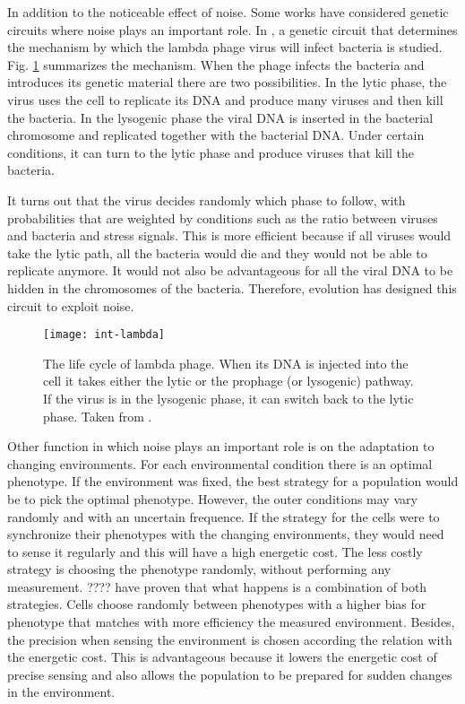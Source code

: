 In addition to the noticeable effect of noise. Some works have considered genetic circuits where noise plays an important role. In \cite{arkin98}, a genetic circuit that determines the mechanism by which the lambda phage virus will infect bacteria is studied. Fig. \ref{fig:int-lambda} summarizes the mechanism. When the phage infects the bacteria and introduces its genetic material there are two possibilities. In the lytic phase, the virus uses the cell to replicate its DNA and produce many viruses and then kill the bacteria. In the lysogenic phase the viral DNA is inserted in the bacterial chromosome and replicated together with the bacterial DNA. Under certain conditions, it can turn to the lytic phase and produce viruses that kill the bacteria.

It turns out that the virus decides randomly which phase to follow, with probabilities that are weighted by conditions such as the ratio between viruses and bacteria and stress signals. This is more efficient because if all viruses would take the lytic path, all the bacteria would die and they would not be able to replicate anymore. It would not also be advantageous for all the viral DNA to be hidden in the chromosomes of the bacteria. Therefore, evolution has designed this circuit to exploit noise.

\begin{figure}[H]
  \centering
  \texttt{[image: int-lambda]}
  \caption[Life cycle of lambda phage]{\label{fig:int-lambda} The life cycle of lambda phage. When its DNA is injected into the cell it takes either the lytic or the prophage (or lysogenic) pathway. If the virus is in the lysogenic phase, it can switch back to the lytic phase. Taken from \cite{alberts08}.}
\end{figure}

Other function in which noise plays an important role is on the adaptation to changing environments. For each environmental condition there is an optimal phenotype. If the environment was fixed, the best strategy for a population would be to pick the optimal phenotype. However, the outer conditions may vary randomly and with an uncertain frequence. If the strategy for the cells were to synchronize their phenotypes with the changing environments, they would need to sense it regularly and this will have a high energetic cost. The less costly strategy is choosing the phenotype randomly, without performing any measurement. ???? have proven that what happens is a combination of both strategies. Cells choose randomly between phenotypes with a higher bias for phenotype that matches with more efficiency the measured environment. Besides, the precision when sensing the environment is chosen according the relation with the energetic cost. This is advantageous because it lowers the energetic cost of precise sensing and also allows the population to be prepared for sudden changes in the environment.

